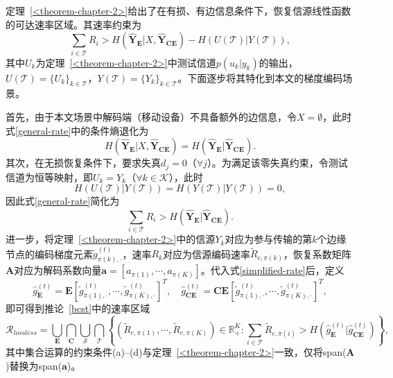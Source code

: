定理~\ref{<theorem-chapter-2>}给出了在有损、有边信息条件下，恢复信源线性函数的可达速率区域。其速率约束为
\begin{equation}
	\sum_{i\in\mathcal{T}}R_i>H(\hat{\mathbf{Y}}_{\mathbf{E}}|X,\hat{\mathbf{Y}}_{\mathbf{C}\mathbf{E}})-H(U(\mathcal{T})|Y(\mathcal{T})),\label{general-rate}
\end{equation}
其中$U_k$为定理~\ref{<theorem-chapter-2>}中测试信道$p(u_k|y_k)$的输出，$U(\mathcal{T})=\{U_k\}_{k\in\mathcal{T}}$，$Y(\mathcal{T})=\{Y_k\}_{k\in\mathcal{T}}$。下面逐步将其特化到本文的梯度编码场景。

首先，由于本文场景中解码端（移动设备）不具备额外的边信息，令$X=\emptyset$，此时式\eqref{general-rate}中的条件熵退化为
\begin{equation}
	H(\hat{\mathbf{Y}}_{\mathbf{E}}|X,\hat{\mathbf{Y}}_{\mathbf{C}\mathbf{E}})=H(\hat{\mathbf{Y}}_{\mathbf{E}}|\hat{\mathbf{Y}}_{\mathbf{C}\mathbf{E}}).
\end{equation}
其次，在无损恢复条件下，要求失真$d_j=0$（$\forall j$）。为满足该零失真约束，令测试信道为恒等映射，即$U_k=Y_k$（$\forall k\in\mathcal{K}$），此时
\begin{equation}
	H(U(\mathcal{T})|Y(\mathcal{T}))=H(Y(\mathcal{T})|Y(\mathcal{T}))=0,
\end{equation}
因此式\eqref{general-rate}简化为
\begin{equation}
	\sum_{i\in\mathcal{T}}R_i>H(\hat{\mathbf{Y}}_{\mathbf{E}}|\hat{\mathbf{Y}}_{\mathbf{C}\mathbf{E}}).\label{simplified-rate}
\end{equation}
进一步，将定理~\ref{<theorem-chapter-2>}中的信源$Y_k$对应为参与传输的第$k$个边缘节点的编码梯度元素$\tilde{g}_{\pi(k),\cdot}^{(t)}$，速率$R_k$对应为信源编码速率$\tilde{R}_{c,\pi(k)}$，恢复系数矩阵$\mathbf{A}$对应为解码系数向量$\mathbf{a}=[a_{\pi(1)},\cdots,a_{\pi(K)}]$。代入式\eqref{simplified-rate}后，定义
\begin{equation}
	\hat{g}_{\mathbf{E}}^{(t)}=\mathbf{E}[\tilde{g}_{\pi(1),\cdot}^{(t)},\cdots,\tilde{g}_{\pi(K),\cdot}^{(t)}]^T,\quad \hat{g}_{\mathbf{C}\mathbf{E}}^{(t)}=\mathbf{C}\mathbf{E}[\tilde{g}_{\pi(1),\cdot}^{(t)},\cdots,\tilde{g}_{\pi(K),\cdot}^{(t)}]^T,
\end{equation}
即可得到推论~\ref{bcst}中的速率区域
\begin{equation}
	\mathcal{R}_{lossless}=\bigcup_{\mathbf{E}}\bigcap_{\mathbf{C}}\bigcup_{\mathcal{S}}\bigcap_{\mathcal{T}}\left\{(\tilde{R}_{c,\pi(1)},\cdots,\tilde{R}_{c,\pi(K)})\in\mathbb{R}_+^K: \sum_{i\in\mathcal{T}}\tilde{R}_{c,\pi(i)}> H(\hat{g}_{\mathbf{E}}^{(t)}|\hat{g}_{\mathbf{C}\mathbf{E}}^{(t)})\right\},
\end{equation}
其中集合运算的约束条件(a)--(d)与定理~\ref{<theorem-chapter-2>}一致，仅将span($\mathbf{A}$)替换为span($\mathbf{a}$)。

